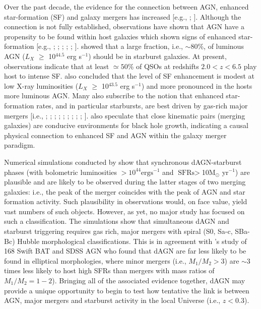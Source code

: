 Over the past decade, the evidence for the connection between AGN, enhanced star-formation (SF) and galaxy mergers has increased [e.g., \cite{2005Natur.433..604D}; \cite{2010ApJ...714L.118D}]. Although the connection is not fully established, observations have shown that AGN have a propensity to be found within host galaxies which shown signs of enhanced star-formation [e.g., \cite{2001ApJ...555..719C}; \cite{2004MNRAS.352..399J}; \cite{Sanchez_2004}; \cite{2006AJ....131...84V}; \cite{2006AJZakamska1496Z}; \cite{2011MNRASKaviraj}]. \cite{tini_Bongiorno_Piconcelli_2013} showed that a large fraction, i.e., $\sim{80}$\%, of luminous AGN ($L_X$ $\ge$ 10$^{44.5}$ erg s$^{-1}$) should be in starburst galaxies. At present, observations indicate that at least $\simeq{50}$\% of QSOs at redshifts ${2.0}<{z}<{6.5}$ play host to intense SF. \cite{2012A&A...540A.109S} also concluded that the level of SF enhancement is modest at low X-ray luminosities ($L_X$ $\ge$ 10$^{43.5}$ erg s$^{-1}$) and more pronounced in the hosts more luminous AGN. Many also subscribe to the notion that enhanced star-formation rates, and in particular starbursts, are best driven by gas-rich major mergers [i.e., \cite{1984MNRAS.209..111J}; \cite{thews_Neugebauer_Scoville_1988}; \cite{Mihos_Hernquist_1996}; \cite{1997AA...326..537D}; \cite{Barton_Geller_Kenyon_2000}; \cite{Tissera_Dominguez-Tenreiro_Scannapieco_Saiz_2002}; \cite{2005A&A...438...87K}; \cite{Narayanan_Groppi_Kulesa_Walker_2005}; \cite{Narayanan_Hayward_Murray_2013}; \cite{Scott_Kaviraj_2013}]. \cite{2011ApJ...743....2S} also speculate that close kinematic pairs (merging galaxies) are conducive environments for black hole growth, indicating a causal physical connection to enhanced SF and AGN within the galaxy merger paradigm.

Numerical simulations conducted by \cite{Dotti_Bellovary_Callegari_2012} show that synchronous dAGN-starburst phases (with bolometric luminosities $>10^{44}\text{erg}\text{s}^{-1}$ and $\text{SFRs}>$10M$_{\odot}$ yr$^{-1}$) are plausible and are likely to be observed during the latter stages of two merging galaxies: i.e., the peak of the merger coincides with the peak of AGN and star formation activity. Such plausibility in observations would, on face value, yield vast numbers of such objects. However, as yet, no major study has focused on such a classification. The \cite{Dotti_Bellovary_Callegari_2012} simulations show that simultaneous dAGN and starburst triggering requires gas rich, major mergers with spiral (S0, Sa-c, SBa-Bc) Hubble morphological classifications. This is in agreement with \cite{Koss_2012}'s study of 168 Swift BAT and SDSS AGN who found that dAGN are far less likely to be found in elliptical morphologies, where minor mergers (i.e., $M_{1}/M_{2}>3$) are $\sim{3}$ times less likely to host high SFRs than mergers with mass ratios of $M_{1}/M_{2}={1-2}$). Bringing all of the associated evidence together, dAGN may provide a unique opportunity to begin to test how tentative the link is between AGN, major mergers and starburst activity in the local Universe (i.e., $z<{0.3}$).             

